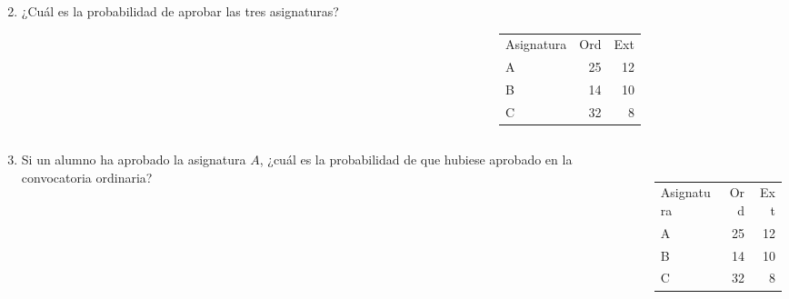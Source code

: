 \documentclass[aspectratio=149,10pt,xcolor=dvipsnames,t]{beamer}
\begin{document}
\begin{frame}
\begin{columns}
\begin{column}[T]{0.6\textwidth}
\begin{enumerate}
\setcounter{enumi}{1}
\item ¿Cuál es la probabilidad de aprobar las tres asignaturas?
\end{enumerate}
\end{column}
\begin{column}[T]{0.4\textwidth}
\\

\medskip
\begin{tabular}{lrr}
\hline
Asignatura & Ord & Ext\\
A & 25 & 12\\
B & 14 & 10\\
C & 32 & 8\\
\hline
\end{tabular}
\end{column}
\end{columns}
\end{frame}


\begin{frame}
\begin{columns}
\begin{column}[T]{0.65\textwidth}
\begin{enumerate}
\setcounter{enumi}{2}
\item Si un alumno ha aprobado la asignatura $A$, ¿cuál es la probabilidad de que hubiese aprobado en la convocatoria ordinaria?
\end{enumerate}
\end{column}
\begin{column}[T]{0.35\textwidth}
\\

\medskip
\begin{tabular}{lrr}
\hline
Asignatura & Ord & Ext\\
A & 25 & 12\\
B & 14 & 10\\
C & 32 & 8\\
\hline
\end{tabular}
\end{column}
\end{columns}
\end{frame}
\end{document}
